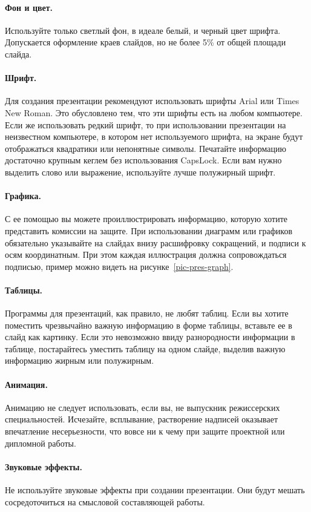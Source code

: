 \paragraph{Фон и цвет.} Используйте только светлый фон, в идеале белый, и черный цвет шрифта. Допускается оформление краев слайдов, но не более 5\% от общей площади слайда. 
\paragraph{Шрифт.} Для создания презентации рекомендуют использовать шрифты Arial или Times New 
    Roman. Это обусловлено тем, что эти шрифты есть на любом компьютере. 
    Если же использовать редкий шрифт, то при использовании презентации на неизвестном 
    компьютере, в котором нет используемого шрифта, на экране будут отображаться квадратики или
     непонятные символы. 
     Печатайте информацию достаточно крупным кеглем без использования CapsLock. Если вам 
     нужно выделить слово или выражение, используйте лучше полужирный шрифт.
\paragraph{Графика.} С ее помощью вы можете проиллюстрировать информацию, которую хотите представить комиссии на защите. При использовании диаграмм или графиков обязательно указывайте на слайдах внизу расшифровку сокращений, и подписи к осям координатным. При этом каждая иллюстрация должна сопровождаться подписью, пример можно видеть на рисунке~\ref{pic-pres-graph}. 
\paragraph{Таблицы.} Программы для презентаций, как правило, не любят таблиц. Если вы хотите поместить чрезвычайно важную информацию в форме таблицы, вставьте ее в слайд как картинку. Если это невозможно ввиду разнородности информации в таблице, постарайтесь уместить таблицу на одном слайде, выделив важную информацию жирным или полужирным.
\paragraph{Анимация.} Анимацию не следует использовать, если вы, не выпускник режиссерских специальностей. Исчезайте, всплывание, растворение надписей оказывает впечатление несерьезности, что вовсе ни к чему при защите проектной или дипломной работы.
\paragraph{Звуковые эффекты.} Не используйте звуковые эффекты при создании презентации. Они будут мешать сосредоточиться на смысловой составляющей работы.
